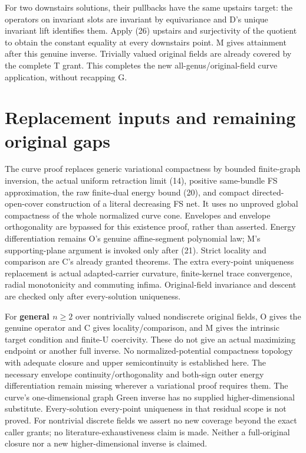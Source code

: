 \documentclass[
  11pt,
]{article}
\begin{document}
For two downstairs solutions, their pullbacks have the same upstairs
target: the operators on invariant slots are invariant by equivariance
and D's unique invariant lift identifies them. Apply (26) upstairs and
surjectivity of the quotient to obtain the constant equality at every
downstairs point. M gives attainment after this genuine inverse.
Trivially valued original fields are already covered by the complete T
grant. This completes the new all-genus/original-field curve
application, without recapping G.

\section{Replacement inputs and remaining original
gaps}\label{replacement-inputs-and-remaining-original-gaps}

The curve proof replaces generic variational compactness by bounded
finite-graph inversion, the actual uniform retraction limit (14),
positive same-bundle FS approximation, the raw finite-dual energy bound
(20), and compact directed-open-cover construction of a literal
decreasing FS net. It uses no unproved global compactness of the whole
normalized curve cone. Envelopes and envelope orthogonality are bypassed
for this existence proof, rather than asserted. Energy differentiation
remains O's genuine affine-segment polynomial law; M's supporting-plane
argument is invoked only after (21). Strict locality and comparison are
C's already granted theorems. The extra every-point uniqueness
replacement is actual adapted-carrier curvature, finite-kernel trace
convergence, radial monotonicity and commuting infima. Original-field
invariance and descent are checked only after every-solution uniqueness.

For \textbf{general \(n\geq2\)} over nontrivially valued nondiscrete
original fields, O gives the genuine operator and C gives
locality/comparison, and M gives the intrinsic target condition and
finite-U coercivity. These do not give an actual maximizing endpoint or
another full inverse. No normalized-potential compactness topology with
adequate closure and upper semicontinuity is established here. The
necessary envelope continuity/orthogonality and both-sign outer energy
differentiation remain missing wherever a variational proof requires
them. The curve's one-dimensional graph Green inverse has no supplied
higher-dimensional substitute. Every-solution every-point uniqueness in
that residual scope is not proved. For nontrivial discrete fields we
assert no new coverage beyond the exact caller grants; no
literature-exhaustiveness claim is made. Neither a full-original closure
nor a new higher-dimensional inverse is claimed.
\end{document}
